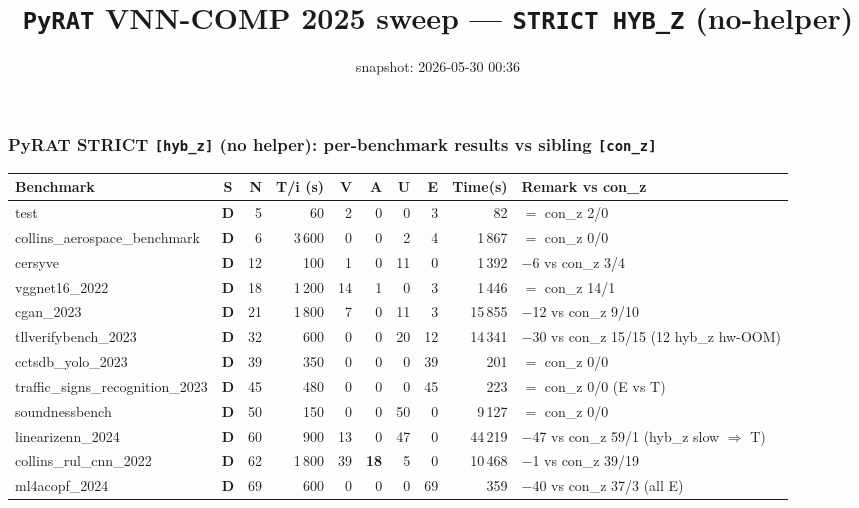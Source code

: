 \documentclass[10pt]{beamer}
\title{\large \texttt{PyRAT} VNN-COMP 2025 sweep --- \texttt{STRICT HYB\_Z} (no-helper)}
\date{snapshot: 2026-05-30 00:36}
\newcommand{\sdone}{{\color{cdone}\textbf{D}}}
\begin{document}
\begin{frame}[fragile]
\frametitle{PyRAT STRICT \texttt{[hyb\_z]} (no helper): per-benchmark results vs sibling \texttt{[con\_z]}}

\centering\tiny
\setlength{\tabcolsep}{3pt}
\begin{tabular}{l c r r r r r r r l}
\toprule
\textbf{Benchmark} & \textbf{S} & \textbf{N} & \textbf{T/i (s)} & \textbf{V} & \textbf{A} & \textbf{U} & \textbf{E} & \textbf{Time(s)} & \textbf{Remark vs con\_z} \\
\midrule
test                              & \sdone & 5     & 60      & 2            & 0           & 0     & 3   & 82      & $=$ con\_z 2/0 \\
collins\_aerospace\_benchmark     & \sdone & 6     & 3\,600  & 0            & 0           & 2     & 4   & 1\,867  & $=$ con\_z 0/0 \\
cersyve                           & \sdone & 12    & 100     & 1            & 0           & 11    & 0   & 1\,392  & $-$6 vs con\_z 3/4 \\
vggnet16\_2022                    & \sdone & 18    & 1\,200  & 14           & 1           & 0     & 3   & 1\,446  & $=$ con\_z 14/1 \\
cgan\_2023                        & \sdone & 21    & 1\,800  & 7            & 0           & 11    & 3   & 15\,855 & $-$12 vs con\_z 9/10 \\
tllverifybench\_2023              & \sdone & 32    & 600     & 0            & 0           & 20    & 12  & 14\,341 & $-$30 vs con\_z 15/15 (12 hyb\_z hw-OOM) \\
cctsdb\_yolo\_2023                & \sdone & 39    & 350     & 0            & 0           & 0     & 39  & 201     & $=$ con\_z 0/0 \\
traffic\_signs\_recognition\_2023 & \sdone & 45    & 480     & 0            & 0           & 0     & 45  & 223     & $=$ con\_z 0/0 (E vs T) \\
soundnessbench                    & \sdone & 50    & 150     & 0            & 0           & 50    & 0   & 9\,127  & $=$ con\_z 0/0 \\
linearizenn\_2024                 & \sdone & 60    & 900     & 13           & 0           & 47    & 0   & 44\,219 & $-$47 vs con\_z 59/1 (hyb\_z slow $\Rightarrow$ T) \\
collins\_rul\_cnn\_2022           & \sdone & 62    & 1\,800  & 39           & \textbf{18} & 5     & 0   & 10\,468 & $-$1 vs con\_z 39/19 \\
ml4acopf\_2024                    & \sdone & 69    & 600     & 0            & 0           & 0     & 69  & 359     & $-$40 vs con\_z 37/3 (all E) \\

\end{tabular}
\end{frame}
\end{document}
